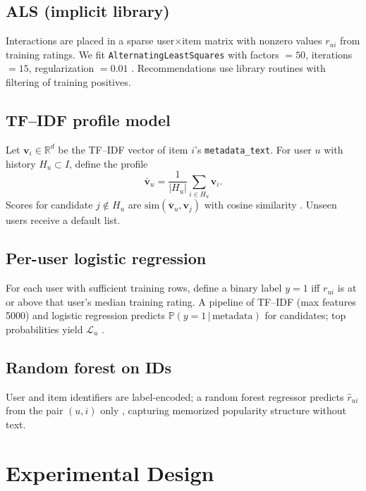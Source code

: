 \documentclass[11pt,a4paper,twoside,openright]{report}
\newcommand{\R}{\mathbb{R}}
\begin{document}
\section{ALS (implicit library)}
Interactions are placed in a sparse user$\times$item matrix with nonzero values $r_{ui}$ from training ratings. We fit \texttt{AlternatingLeastSquares} with factors $=50$, iterations $=15$, regularization $=0.01$ \citep{benfred2018implicit}. Recommendations use library routines with filtering of training positives.

\section{TF--IDF profile model}
Let $\bm{v}_i \in \R^d$ be the TF--IDF vector of item $i$'s \texttt{metadata\_text}. For user $u$ with history $H_u \subset I$, define the profile
\begin{equation}
  \bar{\bm{v}}_u = \frac{1}{|H_u|} \sum_{i \in H_u} \bm{v}_i .
\end{equation}
Scores for candidate $j \notin H_u$ are $\mathrm{sim}(\bar{\bm{v}}_u, \bm{v}_j)$ with cosine similarity \citep{manning2008introduction}. Unseen users receive a default list.

\section{Per-user logistic regression}
For each user with sufficient training rows, define a binary label $y=1$ iff $r_{ui}$ is at or above that user's median training rating. A pipeline of TF--IDF (max features 5000) and logistic regression predicts $\mathbb{P}(y=1\,|\,\text{metadata})$ for candidates; top probabilities yield $\mathcal{L}_u$ \citep{pedregosa2011scikit,hastie2009elements}.

\section{Random forest on IDs}
User and item identifiers are label-encoded; a random forest regressor predicts $\hat{r}_{ui}$ from the pair $(u,i)$ only \citep{breiman2001random,pedregosa2011scikit}, capturing memorized popularity structure without text.

\chapter{Experimental Design}
\end{document}
